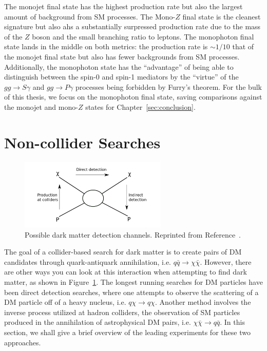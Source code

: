The monojet final state has the highest production rate but also the largest amount of background from SM processes.
The Mono-$Z$ final state is the cleanest signature but also ahs a substantially surpressed production rate due to the mass of the $Z$ boson and the small branching ratio to leptons.
The monophoton final state lands in the middle on both metrics: the production rate is $\sim 1/10$ that of the monojet final state but also has fewer backgrounds from SM processes.
Additionally, the monophoton state has the ``advantage'' of being able to distinguish between the spin-0 and spin-1 mediators by the ``virtue'' of the $gg \rightarrow S \gamma$ and $gg \rightarrow P \gamma$ processes being forbidden by Furry's theorem.
For the bulk of this thesis, we focus on the monophoton final state, saving comparisons against the monojet and mono-$Z$ states for Chapter~\ref{sec:conclusion}. 

\section{Non-collider Searches}
\label{sec:dm_search}

\begin{figure}[htbp]
  \centering
  \includegraphics[width=0.625\textwidth]{DarkMatter/Figures/dm_box.png}
  \caption{
    Possible dark matter detection channels.
    Reprinted from Reference~\cite{}. %
  }
  \label{fig:dm_box}
\end{figure}

The goal of a collider-based search for dark matter is to create pairs of DM candidates through quark-antiquark annihilation, i.e. $q\bar q \rightarrow \chi\bar\chi$.
However, there are other ways you can look at this interaction when attempting to find dark matter, as shown in Figure~\ref{fig:dm_box}.
The longest running searches for DM particles have been direct detection searches, where one attempts to observe the scattering of a DM particle off of a heavy nucleus, i.e. $q \chi \rightarrow q \chi$.
Another method involves the inverse process utilized at hadron colliders, the observation of SM particles produced in the annihilation of astrophysical DM pairs, i.e. $\chi\bar\chi \rightarrow q \bar q$.
In this section, we shall give a brief overview of the leading experiments for these two approaches.

